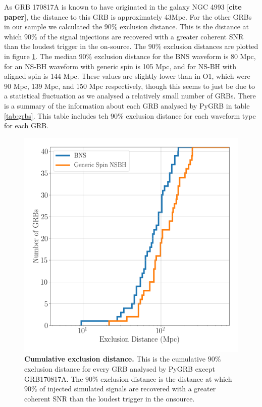 \documentclass[11pt]{cuthesis}
\begin{document}
As GRB 170817A is known to have originated in the galaxy NGC 4993 [\textbf{cite paper}], the distance to this GRB is approximately 43Mpc. For the other GRBs in our sample we calculated the $90\%$ exclusion distance. This is the distance at which $90\%$ of the signal injections are recovered with a greater coherent SNR than the loudest trigger in the on-source. The $90\%$ exclusion distances are plotted in figure \ref{fig:ex dist}. The median $90\%$ exclusion distance for the BNS waveform is 80 Mpc, for an NS-BH waveform with generic spin is 105 Mpc, and for NS-BH with aligned spin is 144 Mpc. These values are slightly lower than in O1, which were 90 Mpc, 139 Mpc, and 150 Mpc respectively, though this seems to just be due to a statistical fluctuation as we analysed a relatively small number of GRBs. There is a summary of the information about each GRB analysed by PyGRB in table \ref{tab:grbs}. This table includes teh $90\%$ exclusion distance for each waveform type for each GRB.

\begin{figure}
\begin{center}
\includegraphics[width=0.8\linewidth]{pygrb_exclusion_distance.png}
\end{center}
\caption{\textbf{Cumulative exclusion distance.} This is the cumulative $90\%$ exclusion distance for every GRB analysed by PyGRB except GRB170817A.  The $90\%$ exclusion distance is the distance at which $90\%$ of injected simulated signals are recovered with a greater coherent SNR than the loudest trigger in the onsource. }
\label{fig:ex dist}
\end{figure}
\end{document}
